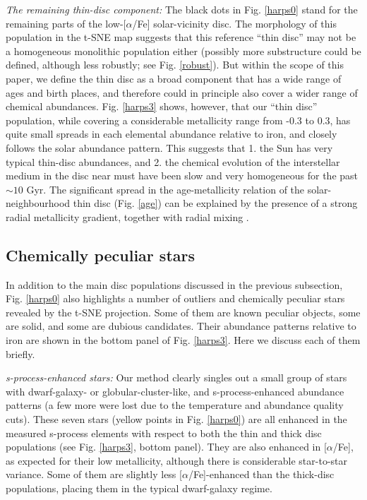\documentclass{aa}  %
\begin{document}
{\it The remaining thin-disc component:} The black dots in Fig. \ref{harps0} stand for the remaining parts of the low-[$\alpha$/Fe] solar-vicinity disc. The morphology of this population in the t-SNE map suggests that this reference ``thin disc'' may not be a homogeneous monolithic population either (possibly more substructure could be defined, although less robustly; see Fig. \ref{robust}). But within the scope of this paper, we define the thin disc as a broad component that has a wide range of ages and birth places, and therefore could in principle also cover a wider range of chemical abundances. Fig. \ref{harps3} shows, however, that our ``thin disc'' population, while covering a considerable metallicity range from -0.3 to 0.3, has quite small spreads in each elemental abundance relative to iron, and closely follows the solar abundance pattern. This suggests that 1. the Sun has very typical thin-disc abundances, and 2. the chemical evolution of the interstellar medium in the disc near must have been slow and very homogeneous for the past $\sim10$ Gyr. The significant spread in the age-metallicity relation of the solar-neighbourhood thin disc (Fig. \ref{age}) can be explained by the presence of a strong radial metallicity gradient, together with radial mixing \citep[e.g.][Minchev et al., in prep.]{Edvardsson1993, Minchev2013, Anders2017a}.

\subsection{Chemically peculiar stars}

In addition to the main disc populations discussed in the previous subsection, Fig. \ref{harps0} also highlights a number of outliers and chemically peculiar stars revealed by the t-SNE projection. Some of them are known peculiar objects, some are solid, and some are dubious candidates. Their abundance patterns relative to iron are shown in the bottom panel of Fig. \ref{harps3}. Here we discuss each of them briefly.

{\it s-process-enhanced stars:} Our method clearly singles out a small group of stars with dwarf-galaxy- or globular-cluster-like, and s-process-enhanced abundance patterns (a few more were lost due to the temperature and abundance quality cuts). These seven stars (yellow points in Fig. \ref{harps0}) are all enhanced in the measured s-process elements with respect to both the thin and thick disc populations (see Fig. \ref{harps3}, bottom panel). They are also enhanced in [$\alpha$/Fe], as expected for their low metallicity, although there is considerable star-to-star variance. Some of them are slightly less [$\alpha$/Fe]-enhanced than the thick-disc populations, placing them in the typical dwarf-galaxy regime. 
\end{document}
